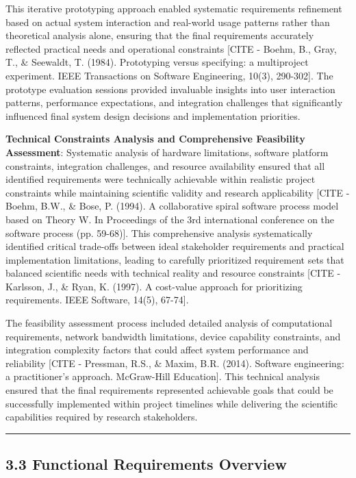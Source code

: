 \documentclass[12pt,a4paper]{article}
\begin{document}
This iterative prototyping approach enabled systematic requirements refinement based on actual system interaction and
real-world usage patterns rather than theoretical analysis alone, ensuring that the final requirements accurately
reflected practical needs and operational
constraints [CITE - Boehm, B., Gray, T., \& Seewaldt, T. (1984). Prototyping versus specifying: a multiproject experiment. IEEE Transactions on Software Engineering, 10(3), 290-302].
The prototype evaluation sessions provided invaluable insights into user interaction patterns, performance expectations,
and integration challenges that significantly influenced final system design decisions and implementation priorities.

\textbf{Technical Constraints Analysis and Comprehensive Feasibility Assessment}: Systematic analysis of hardware
limitations, software platform constraints, integration challenges, and resource availability ensured that all
identified requirements were technically achievable within realistic project constraints while maintaining scientific
validity and research
applicability [CITE - Boehm, B.W., \& Bose, P. (1994). A collaborative spiral software process model based on Theory W. In Proceedings of the 3rd international conference on the software process (pp. 59-68)].
This comprehensive analysis systematically identified critical trade-offs between ideal stakeholder requirements and
practical implementation limitations, leading to carefully prioritized requirement sets that balanced scientific needs
with technical reality and resource
constraints [CITE - Karlsson, J., \& Ryan, K. (1997). A cost-value approach for prioritizing requirements. IEEE Software, 14(5), 67-74].

The feasibility assessment process included detailed analysis of computational requirements, network bandwidth
limitations, device capability constraints, and integration complexity factors that could affect system performance and
reliability [CITE - Pressman, R.S., \& Maxim, B.R. (2014). Software engineering: a practitioner's approach. McGraw-Hill Education].
This technical analysis ensured that the final requirements represented achievable goals that could be successfully
implemented within project timelines while delivering the scientific capabilities required by research stakeholders.

\hrule

\subsection{3.3 Functional Requirements Overview}
\end{document}
